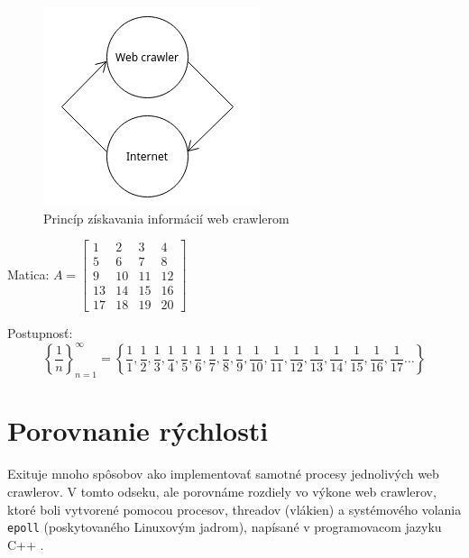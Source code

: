 \documentclass[10pt,twoside,slovak,a4paper]{article}
\begin{document}
\begin{figure}
	\includegraphics[width=\textwidth]{diagram2.png}
	\caption{Princíp získavania informácií web crawlerom \cite{sharma2011novel}}
\end{figure}

Matica:
$A=\begin{bmatrix}
1  & 2  & 3  & 4  \\
5  & 6  & 7  & 8  \\
9  & 10 & 11 & 12 \\
13 & 14 & 15 & 16 \\
17 & 18 & 19 & 20
\end{bmatrix}$

\vspace{\baselineskip}

Postupnosť:
\begin{equation*}
\left\{\frac{1}{n}\right\}^{\infty}_{n=1}=\left\{\frac{1}{1},\frac{1}{2},\frac{1}{3},\frac{1}{4},\frac{1}{5},\frac{1}{6},\frac{1}{7},\frac{1}{8},\frac{1}{9},\frac{1}{10},\frac{1}{11},\frac{1}{12},\frac{1}{13},\frac{1}{14},\frac{1}{15},\frac{1}{16},\frac{1}{17}\ldots\right\}
\end{equation*}

\section{Porovnanie rýchlosti}
Exituje mnoho spôsobov ako implementovať samotné procesy jednolivých web crawlerov. V tomto odseku, ale porovnáme rozdiely vo výkone web crawlerov, ktoré boli vytvorené pomocou procesov, threadov (vlákien) a systémového volania \texttt{epoll} (poskytovaného Linuxovým jadrom), napísané v programovacom jazyku C++ \cite{9648837}. \\
\end{document}
